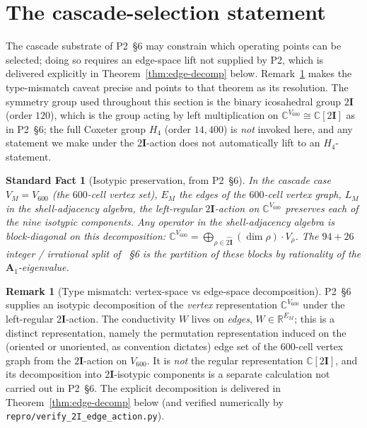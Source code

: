 \documentclass[11pt]{article}
\newtheorem{fact}[theorem]{Standard Fact}
\theoremstyle{definition}
\newtheorem{remark}[theorem]{Remark}
\newcommand{\R}{\mathbb{R}}
\newcommand{\C}{\mathbb{C}}
\newcommand{\twoI}{2\mathbf{I}}
\begin{document}
\section{The cascade-selection statement}\label{sec:cascade-selection}

The cascade substrate of P2~\S 6 may constrain which operating points can be selected; doing so requires an edge-space lift not supplied by P2, which is delivered explicitly in Theorem~\ref{thm:edge-decomp} below. Remark~\ref{rem:type-mismatch} makes the type-mismatch caveat precise and points to that theorem as its resolution. The symmetry group used throughout this section is the binary icosahedral group $\twoI$ (order $120$), which is the group acting by left multiplication on $\C^{V_{600}} \cong \C[\twoI]$ as in P2~\S 6; the full Coxeter group $H_4$ (order $14{,}400$) is \emph{not} invoked here, and any statement we make under the $\twoI$-action does not automatically lift to an $H_4$-statement.

\begin{fact}[Isotypic preservation, from P2~\S 6]\label{fact:isotypic}
In the cascade case $V_M = V_{600}$ (the $600$-cell vertex set), $E_M$ the edges of the $600$-cell vertex graph, $L_M$ in the shell-adjacency algebra, the left-regular $\twoI$-action on $\C^{V_{600}}$ preserves each of the nine isotypic components. Any operator in the shell-adjacency algebra is block-diagonal on this decomposition: $\C^{V_{600}} = \bigoplus_{\rho \in \widehat{\twoI}} (\dim \rho)\cdot V_\rho$. The $94 + 26$ integer / irrational split of~\citep{CascadeAlgSubstrate} §6 is the partition of these blocks by rationality of the $\mathbf{A}_1$-eigenvalue.
\end{fact}

\begin{remark}[Type mismatch: vertex-space vs edge-space decomposition]\label{rem:type-mismatch}
P2~\S 6 supplies an isotypic decomposition of the \emph{vertex} representation $\C^{V_{600}}$ under the left-regular $\twoI$-action. The conductivity $W$ lives on \emph{edges}, $W \in \R^{E_M}$; this is a distinct representation, namely the permutation representation induced on the (oriented or unoriented, as convention dictates) edge set of the $600$-cell vertex graph from the $\twoI$-action on $V_{600}$. It is \emph{not} the regular representation $\C[\twoI]$, and its decomposition into $\twoI$-isotypic components is a separate calculation not carried out in P2~\S 6. The explicit decomposition is delivered in Theorem~\ref{thm:edge-decomp} below (and verified numerically by \texttt{repro/verify\_2I\_edge\_action.py}).
\end{remark}
\end{document}
